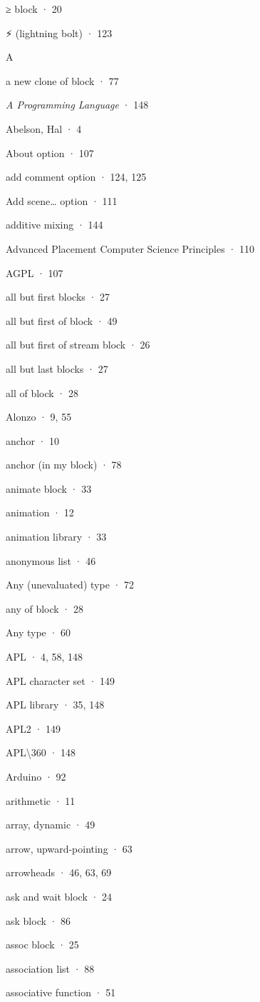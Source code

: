 \documentclass[
  letterpaper,
]{book}
\begin{document}
≥ block · 20

⚡ (lightning bolt) · 123

A

a new clone of block · 77

\emph{A Programming Language} · 148

Abelson, Hal · 4

About option · 107

add comment option · 124, 125

Add scene\ldots{} option · 111

additive mixing · 144

Advanced Placement Computer Science Principles · 110

AGPL · 107

all but first blocks · 27

all but first of block · 49

all but first of stream block · 26

all but last blocks · 27

all of block · 28

Alonzo · 9, 55

anchor · 10

anchor (in my block) · 78

animate block · 33

animation · 12

animation library · 33

anonymous list · 46

Any (unevaluated) type · 72

any of block · 28

Any type · 60

APL · 4, 58, 148

APL character set · 149

APL library · 35, 148

APL2 · 149

APL\textbackslash360 · 148

Arduino · 92

arithmetic · 11

array, dynamic · 49

arrow, upward-pointing · 63

arrowheads · 46, 63, 69

ask and wait block · 24

ask block · 86

assoc block · 25

association list · 88

associative function · 51
\end{document}
